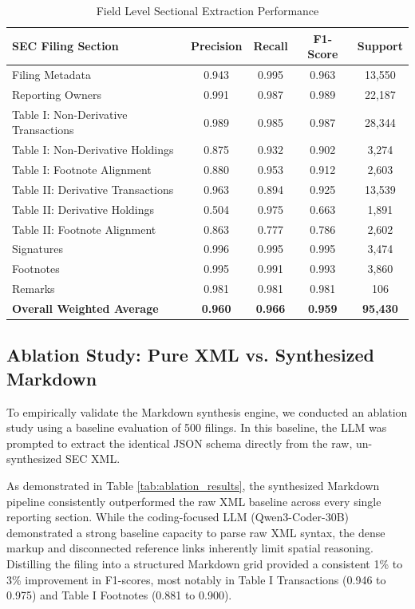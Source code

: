 \documentclass[journal, onecolumn]{IEEEtran}
\begin{document}
\begin{table}[h]
\centering
\caption{Field Level Sectional Extraction Performance}
\label{tab:extraction_results}
\begin{tabular}{lcccc}
\toprule
\textbf{SEC Filing Section} & \textbf{Precision} & \textbf{Recall} & \textbf{F1-Score} & \textbf{Support} \\
\midrule
Filing Metadata & 0.943 & 0.995 & 0.963 & 13,550 \\
Reporting Owners & 0.991 & 0.987 & 0.989 & 22,187 \\
Table I: Non-Derivative Transactions & 0.989 & 0.985 & 0.987 & 28,344 \\
Table I: Non-Derivative Holdings & 0.875 & 0.932 & 0.902 & 3,274 \\
Table I: Footnote Alignment & 0.880 & 0.953 & 0.912 & 2,603 \\ \hline
Table II: Derivative Transactions & 0.963 & 0.894 & 0.925 & 13,539 \\
Table II: Derivative Holdings & 0.504 & 0.975 & 0.663 & 1,891 \\
Table II: Footnote Alignment & 0.863 & 0.777 & 0.786 & 2,602 \\ \hline
Signatures & 0.996 & 0.995 & 0.995 & 3,474 \\
Footnotes & 0.995 & 0.991 & 0.993 & 3,860 \\
Remarks & 0.981 & 0.981 & 0.981 & 106 \\ \hline
\textbf{Overall Weighted Average} & \textbf{0.960} & \textbf{0.966} & \textbf{0.959} & \textbf{95,430} \\
\bottomrule
\end{tabular}
\end{table}

\subsection{Ablation Study: Pure XML vs. Synthesized Markdown}
To empirically validate the Markdown synthesis engine, we conducted an ablation study using a baseline evaluation of 500 filings. In this baseline, the LLM was prompted to extract the identical JSON schema directly from the raw, un-synthesized SEC XML. 

As demonstrated in Table \ref{tab:ablation_results}, the synthesized Markdown pipeline consistently outperformed the raw XML baseline across every single reporting section. While the coding-focused LLM (Qwen3-Coder-30B) demonstrated a strong baseline capacity to parse raw XML syntax, the dense markup and disconnected reference links inherently limit spatial reasoning. Distilling the filing into a structured Markdown grid provided a consistent 1\% to 3\% improvement in F1-scores, most notably in Table I Transactions (0.946 to 0.975) and Table I Footnotes (0.881 to 0.900). 
\end{document}
